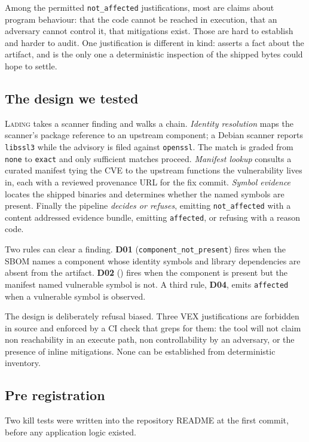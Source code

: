 Among the permitted \texttt{not\_affected} justifications, most are claims about
program behaviour: that the code cannot be reached in execution, that an
adversary cannot control it, that mitigations exist. Those are hard to establish
and harder to audit. One justification is different in kind:
\vcnp{} asserts a fact about the artifact, and is
the only one a deterministic inspection of the shipped bytes could hope to
settle.

\subsection{The design we tested}

\textsc{Lading} takes a scanner finding and walks a chain. \emph{Identity
resolution} maps the scanner's package reference to an upstream component; a
Debian scanner reports \texttt{libssl3} while the advisory is filed against
\texttt{openssl}. The match is graded from \texttt{none} to \texttt{exact} and
only sufficient matches proceed. \emph{Manifest lookup} consults a curated
manifest tying the CVE to the upstream functions the vulnerability lives in, each
with a reviewed provenance URL for the fix commit. \emph{Symbol evidence} locates
the shipped binaries and determines whether the named symbols are present.
Finally the pipeline \emph{decides or refuses}, emitting
\texttt{not\_affected} with a content addressed evidence bundle, emitting
\texttt{affected}, or refusing with a reason code.

Two rules can clear a finding. \textbf{D01} (\texttt{component\_not\_present})
fires when the SBOM names a component whose identity symbols and library
dependencies are absent from the artifact. \textbf{D02}
(\vcnp{}) fires when the component is present but
the manifest named vulnerable symbol is not. A third rule, \textbf{D04}, emits
\texttt{affected} when a vulnerable symbol is observed.

The design is deliberately refusal biased. Three VEX justifications are forbidden
in source and enforced by a CI check that greps for them: the tool will not claim
non reachability in an execute path, non controllability by an adversary, or the
presence of inline mitigations. None can be established from deterministic
inventory.

\subsection{Pre registration}

Two kill tests were written into the repository README at the first commit,
before any application logic existed.

